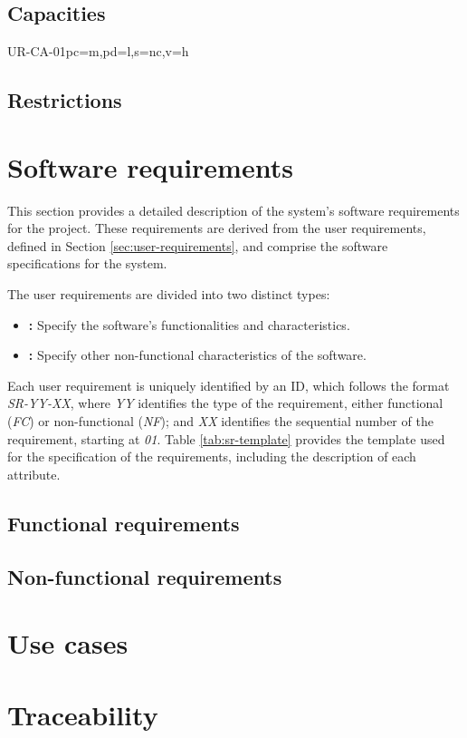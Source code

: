 \subsection{Capacities}\label{subsec:capacities}

\begin{userReq}{UR-CA-01}{pc=m,pd=l,s=nc,v=h}
  \lipsum[1][1-3]
\end{userReq}


\subsection{Restrictions}\label{subsec:restrictions}




\section{Software requirements}\label{sec:soft-requirements}
This section provides a detailed description of the system's software requirements for the project. These requirements are derived from the user requirements, defined in Section \ref{sec:user-requirements}, and comprise the software specifications for the system.

The user requirements are divided into two distinct types:
\begin{itemize}[noitemsep]
  \item \textbf{:} Specify the software's functionalities and characteristics.
  \item \textbf{:} Specify other non-functional characteristics of the software.
\end{itemize}

Each user requirement is uniquely identified by an ID, which follows the format \textit{SR-YY-XX}, where \textit{YY} identifies the type of the requirement, either functional (\textit{FC}) or non-functional (\textit{NF}); and \textit{XX} identifies the sequential number of the requirement, starting at \textit{01}. Table \ref{tab:sr-template} provides the template used for the specification of the requirements, including the description of each attribute.



\subsection{Functional requirements}\label{subsec:func-req}


\subsection{Non-functional requirements}\label{subsec:non-func-req}




\section{Use cases}\label{sec:use-cases}






\section{Traceability}\label{sec:req-traceability}